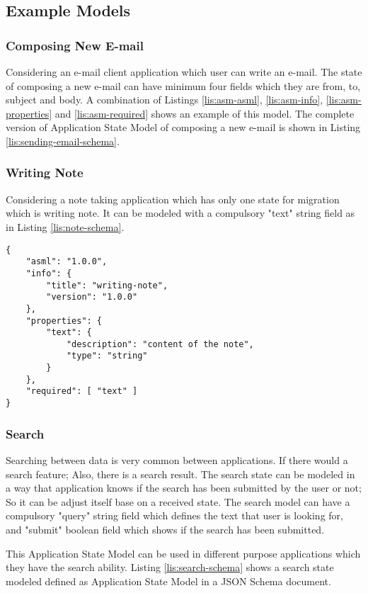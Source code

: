 \subsection{Example Models}
\subsubsection{Composing New E-mail}
Considering an e-mail client application which user can write an e-mail. The state of composing a new e-mail can have minimum four fields which they are from, to, subject and body. A combination of Listings \ref{lis:asm-asml},  \ref{lis:asm-info},  \ref{lis:asm-properties} and  \ref{lis:asm-required} shows an example of this model.
The complete version of Application State Model of composing a new e-mail is shown in Listing \ref{lis:sending-email-schema}.
\subsubsection{Writing Note}
Considering a note taking application which has only one state for migration which is writing note. It can be modeled with a compulsory "text" string field as in Listing \ref{lis:note-schema}.

\lstset{
  label=lis:note-schema, caption=Note Writing example model as JSON Schema document., 
  basicstyle=\ttfamily\footnotesize, frame=single, captionpos=b,
  xleftmargin=.01\textwidth, xrightmargin=.01\textwidth,
  breaklines=true
}
\begin{lstlisting}
{
    "asml": "1.0.0",
    "info": {
        "title": "writing-note",
        "version": "1.0.0"
    },
    "properties": {
        "text": {
            "description": "content of the note",
            "type": "string"
        }
    },
    "required": [ "text" ]
}
\end{lstlisting}
\subsubsection{Search}
Searching between data is very common between applications. If there would a search feature; Also, there is a search result. The search state can be modeled in a way that application knows if the search has been submitted by the user or not; So it can be adjust itself base on a received state. The search model can have a compulsory "query" string field which defines the text that user is looking for, and "submit" boolean field which shows if the search has been submitted.

This Application State Model can be used in different purpose applications which they have the search ability. Listing \ref{lis:search-schema} shows a search state modeled defined as Application State Model in a JSON Schema document.

